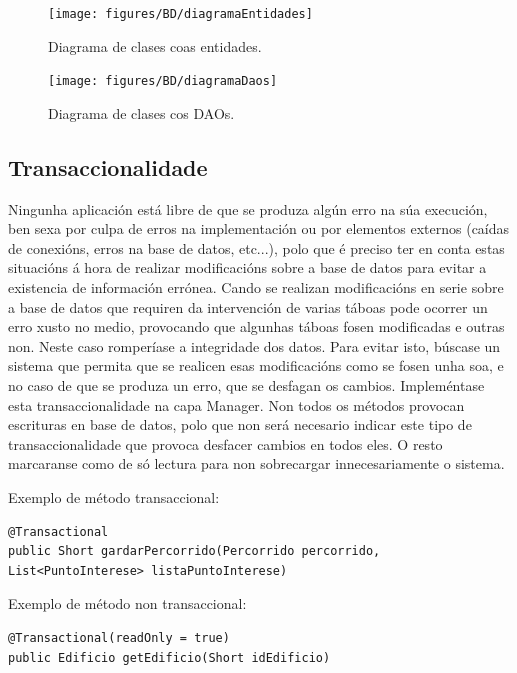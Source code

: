 \begin{figure}[tb] 
	\begin{center}
		\texttt{[image: figures/BD/diagramaEntidades]}
		\caption{Diagrama de clases coas entidades.}
		\label{fig:entidades}
	\end{center}
\end{figure}

\begin{figure}[tb] 
	\begin{center}
		\texttt{[image: figures/BD/diagramaDaos]}
		\caption{Diagrama de clases cos DAOs.}
		\label{fig:daos}
	\end{center}
\end{figure}


\subsection{Transaccionalidade}
Ningunha aplicación está libre de que se produza algún erro na súa execución, ben sexa por culpa de erros na implementación ou por elementos externos (caídas de conexións, erros na base de datos, etc...), polo que é preciso ter en conta estas situacións á hora de realizar modificacións sobre a base de datos para evitar a existencia de información errónea. Cando se realizan modificacións en serie sobre a base de datos que requiren da intervención de varias táboas pode ocorrer un erro xusto no medio, provocando que algunhas táboas fosen modificadas e outras non. Neste caso romperíase a integridade dos datos. Para evitar isto, búscase un sistema que permita que se realicen esas modificacións como se fosen unha soa, e no caso de que se produza un erro, que se desfagan os cambios.
Impleméntase esta transaccionalidade na capa Manager. Non todos os métodos provocan escrituras en base de datos, polo que non será necesario indicar este tipo de transaccionalidade que provoca desfacer cambios en todos eles. O resto marcaranse como de só lectura para non sobrecargar innecesariamente o sistema.

Exemplo de método transaccional:
\begin{lstlisting}
@Transactional
public Short gardarPercorrido(Percorrido percorrido, List<PuntoInterese> listaPuntoInterese)
\end{lstlisting}

Exemplo de método non transaccional:
\begin{lstlisting}
@Transactional(readOnly = true)
public Edificio getEdificio(Short idEdificio)
\end{lstlisting}


